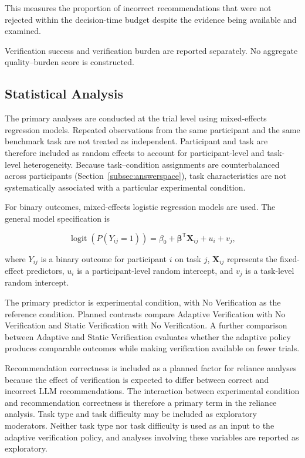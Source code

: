 \documentclass[oneside,final,14pt,a4paper]{extreport}
\begin{document}
This measures the proportion of incorrect recommendations that were not
rejected within the decision-time budget despite the evidence being available
and examined.

Verification success and verification burden are reported separately. No
aggregate quality--burden score is constructed.

\subsection{Statistical Analysis}
\label{subsec:analysis}

The primary analyses are conducted at the trial level using mixed-effects
regression models. Repeated observations from the same participant and the
same benchmark task are not treated as independent. Participant and task are
therefore included as random effects to account for participant-level and
task-level heterogeneity. Because task--condition assignments are
counterbalanced across participants (Section~\ref{subsec:answerspace}), task
characteristics are not systematically associated with a particular
experimental condition.

For binary outcomes, mixed-effects logistic regression models are used. The
general model specification is

$$
\operatorname{logit}\!\left(P(Y_{ij}=1)\right)
=
\beta_0
+
\boldsymbol{\beta}^{\mathsf{T}}\mathbf{X}_{ij}
+
u_i
+
v_j,
$$

where $Y_{ij}$ is a binary outcome for participant $i$ on task $j$,
$\mathbf{X}_{ij}$ represents the fixed-effect predictors, $u_i$ is a
participant-level random intercept, and $v_j$ is a task-level random
intercept.

The primary predictor is experimental condition, with No Verification as the
reference condition. Planned contrasts compare Adaptive Verification with No
Verification and Static Verification with No Verification. A further
comparison between Adaptive and Static Verification evaluates whether the
adaptive policy produces comparable outcomes while making verification
available on fewer trials.

Recommendation correctness is included as a planned factor for reliance
analyses because the effect of verification is expected to differ between
correct and incorrect LLM recommendations. The interaction between
experimental condition and recommendation correctness is therefore a primary
term in the reliance analysis. Task type and task difficulty may be included
as exploratory moderators. Neither task type nor task difficulty is used as
an input to the adaptive verification policy, and analyses involving these
variables are reported as exploratory.
\end{document}

